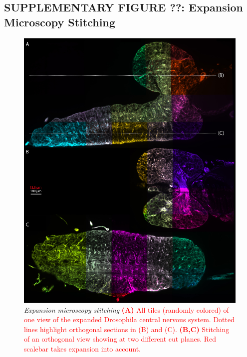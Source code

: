 \documentclass[]{spie}  %
\def\red{\textcolor{red}}
\begin{document}
\subsection*{SUPPLEMENTARY FIGURE ??: Expansion Microscopy Stitching}
\begin{figure}[h!]
\center\includegraphics[width=\textwidth-1.35cm]{fig-expansion_tiling.jpg}
\vspace{2.0mm}
\caption{\hspace{-0.5mm} \emph{Expansion microscopy stitching} \red{\textbf{(A)} All tiles (randomly colored) of one view of the expanded Drosophila central nervous system. Dotted lines highlight orthogonal sections in (B) and (C). \textbf{(B,C)} Stitching of an orthogonal view showing at two different cut planes. Red scalebar takes expansion into account.}
}
\label{fig:sup-fig-expansion-microscopy}
\end{figure}

\pagebreak
\end{document}

